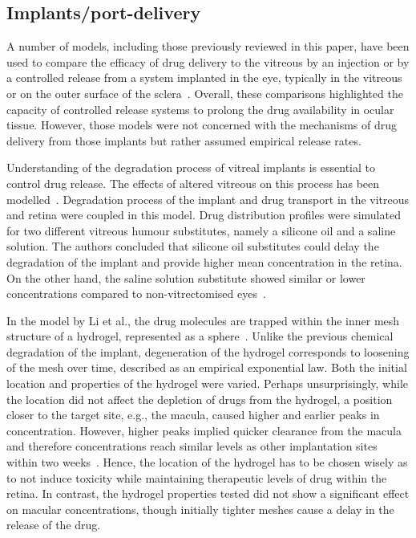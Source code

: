 \documentclass{article}
\begin{document}
\subsection{Implants/port-delivery}

A number of models, including those previously reviewed in this paper, have been used to compare the efficacy of drug delivery to the vitreous by an injection or by a controlled release from a system implanted in the eye, typically in the vitreous or on the outer surface of the sclera~\cite{Jooybar_2014,Kathawate_2008,Kavousanakis_2014,Park_2005}.
Overall, these comparisons highlighted the capacity of controlled release systems to prolong the drug availability in ocular tissue.
However, those models were not concerned with the mechanisms of drug delivery from those implants but rather assumed empirical release rates.

Understanding of the degradation process of vitreal implants is essential to control drug release.
The effects of altered vitreous on this process has been modelled~\cite{Ferreira_2020}.
Degradation process of the implant and drug transport in the vitreous and retina were coupled in this model.
Drug distribution profiles were simulated for two different vitreous humour substitutes, namely a silicone oil and a saline solution.
The authors concluded that silicone oil substitutes could delay the degradation of the implant and provide higher mean concentration in the retina.
On the other hand, the saline solution substitute showed similar or lower concentrations compared to non-vitrectomised eyes~\cite{Ferreira_2020}.

In the model by Li et al., the drug molecules are trapped within the inner mesh structure of a hydrogel, represented as a sphere~\cite{Li_2022a}.
Unlike the previous chemical degradation of the implant, degeneration of the hydrogel corresponds to loosening of the mesh over time, described as an empirical exponential law.
Both the initial location and properties of the hydrogel were varied.
Perhaps unsurprisingly, while the location did not affect the depletion of drugs from the hydrogel, a position closer to the target site, e.g., the macula, caused higher and earlier peaks in concentration.
However, higher peaks implied quicker clearance from the macula and therefore concentrations reach similar levels as other implantation sites within two weeks~\cite{Li_2022a}.
Hence, the location of the hydrogel has to be chosen wisely as to not induce toxicity while maintaining therapeutic levels of drug within the retina.
In contrast, the hydrogel properties tested did not show a significant effect on macular concentrations, though initially tighter meshes cause a delay in the release of the drug.
\end{document}
